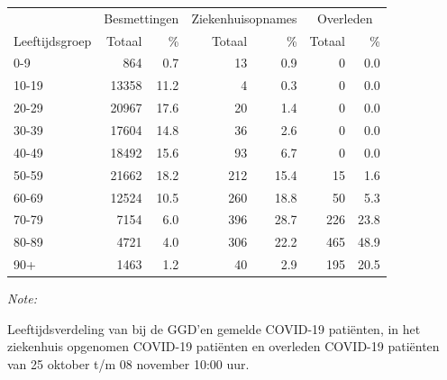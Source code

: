 \documentclass[
  english,
  man,floatsintext]{apa6}
\begin{document}
\begin{table}[H]
\centering\begingroup\fontsize{11}{13}\selectfont

\begin{threeparttable}
\begin{tabular}{lrrrrrr}
\toprule
\multicolumn{1}{c}{ } & \multicolumn{2}{c}{Besmettingen} & \multicolumn{2}{c}{Ziekenhuisopnames} & \multicolumn{2}{c}{Overleden} \\
\cmidrule(l{3pt}r{3pt}){2-3} \cmidrule(l{3pt}r{3pt}){4-5} \cmidrule(l{3pt}r{3pt}){6-7}
Leeftijdsgroep & Totaal & \% & Totaal & \% & Totaal & \%\\
\midrule
0-9 & 864 & 0.7 & 13 & 0.9 & 0 & 0.0\\
10-19 & 13358 & 11.2 & 4 & 0.3 & 0 & 0.0\\
20-29 & 20967 & 17.6 & 20 & 1.4 & 0 & 0.0\\
30-39 & 17604 & 14.8 & 36 & 2.6 & 0 & 0.0\\
40-49 & 18492 & 15.6 & 93 & 6.7 & 0 & 0.0\\
50-59 & 21662 & 18.2 & 212 & 15.4 & 15 & 1.6\\
60-69 & 12524 & 10.5 & 260 & 18.8 & 50 & 5.3\\
70-79 & 7154 & 6.0 & 396 & 28.7 & 226 & 23.8\\
80-89 & 4721 & 4.0 & 306 & 22.2 & 465 & 48.9\\
90+ & 1463 & 1.2 & 40 & 2.9 & 195 & 20.5\\
\bottomrule
\end{tabular}
\begin{tablenotes}
\item \textit{Note: } 
\item Leeftijdsverdeling van bij de GGD’en gemelde COVID-19 patiënten, in het ziekenhuis opgenomen COVID-19 patiënten en overleden COVID-19 patiënten van 25 oktober t/m 08 november 10:00 uur.
\end{tablenotes}
\end{threeparttable}
\endgroup{}
\end{table}
\end{document}
